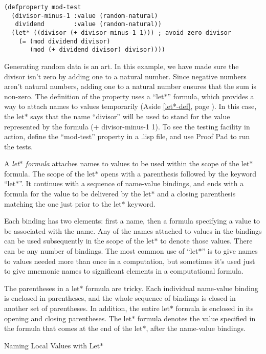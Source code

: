 \begin{Verbatim}
(defproperty mod-test
  (divisor-minus-1 :value (random-natural)
   dividend        :value (random-natural))
  (let* ((divisor (+ divisor-minus-1 1))) ; avoid zero divisor
    (= (mod dividend divisor)
       (mod (+ dividend divisor) divisor))))
\end{Verbatim}

Generating random data is an art.
In this example, we have made sure the divisor isn't zero
by adding one to a natural number.
Since negative numbers aren't natural numbers, adding one
to a natural number ensures that the sum is non-zero.
\label{let-example-brief-explain}
The definition of the property uses a
``let$*$'' formula,
which provides a way to attach names to values temporarily
(Aside \ref{let*-def}, page \pageref{let*-def}).
In this case, the let$*$ says that
the name ``divisor'' will be used to stand for
the value represented by the formula (+ divisor-minus-1 1).
To see the testing facility in action,
define the ``mod-test'' property in a .lisp file,
and use Proof Pad to run the tests.

\begin{aside}
A \emph{let$*$ formula} attaches names to values
to be used within the scope of the let$*$ formula.
The scope of the let$*$ opens with a parenthesis followed
by the keyword ``let$*$''. It continues with
a sequence of name-value bindings, and ends with
a formula for the value to be delivered by the let$*$
and a closing parenthesis matching the one just prior
to the let$*$ keyword.

Each binding has two elements: first a name,
then a formula specifying a value to be associated with the name.
Any of the names attached to values in the bindings
can be used subsequently in the scope of the let$*$ to denote those values.
There can be any number of bindings.
The most common use of ``let$*$'' is to give names
to values needed more than once in a computation,
but sometimes it's used just to give mnemonic names
to significant elements in a computational formula.

The parentheses in a let$*$ formula are tricky.
Each individual name-value binding is enclosed in parentheses,
and the whole sequence of bindings is closed in another set
of parentheses. In addition, the entire let$*$ formula
is enclosed in its opening and closing parentheses.
The let$*$ formula denotes the value specified
in the formula that comes at the end of the let$*$, after the
name-value bindings.
\caption{Naming Local Values with Let$*$}
\label{let*-def}
\end{aside}

